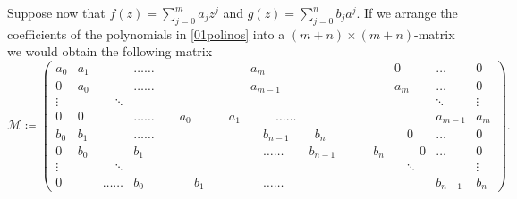 Suppose now that $f(z) = \sum_{j=0}^ma_jz^j$ and $g(z) = \sum_{j=0}^nb_ja^j$. If we arrange the coefficients of the polynomials in \eqref{01polinos} into a $(m+n)\times(m+n)$-matrix we would obtain the following matrix
$$\mathcal{M} \coloneqq \begin{pmatrix}
a_0 & a_1 & \dots\dots & a_m & 0 & \dots & 0 \\
0  & a_0 & \dots\dots & a_{m-1} & a_m & \dots & 0  \\
\vdots & \quad \quad \quad \ddots  &  &  & & \ddots &\vdots  \\
0   & 0   &  \dots \dots \quad\quad a_0 \quad \quad \quad a_1 & \quad \quad \dots \dots & & a_{m-1} & a_m\\
b_0 & b_1 & \dots\dots &\quad b_{n-1}\quad \quad b_n & \quad 0 & \dots & 0 \\
 0   & b_0 & b_1 & \quad \dots \dots  \quad \quad b_{n-1}\quad  \quad \quad b_n & \qquad 0 & \dots & 0\\
\vdots &  \quad \quad \quad \ddots   &   &   &    \quad \ddots   & & \vdots\\
 0   & \quad \quad \dots \dots & b_0 \quad \quad \quad \quad b_1 & \quad \dots \dots &  & b_{n-1}  & b_n
\end{pmatrix}.$$

